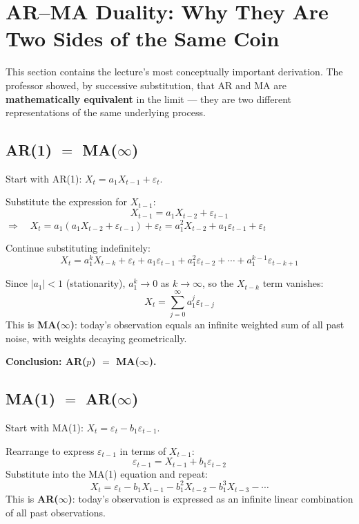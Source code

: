 \documentclass[11pt]{article}
\begin{document}
\section{AR--MA Duality: Why They Are Two Sides of the Same Coin}

This section contains the lecture's most conceptually important derivation.
The professor showed, by successive substitution, that AR and MA are
\textbf{mathematically equivalent} in the limit --- they are two different
representations of the same underlying process.

\subsection{AR(1) $=$ MA($\infty$)}
Start with AR(1): $X_t = a_1 X_{t-1} + \varepsilon_t$.

Substitute the expression for $X_{t-1}$:
\[
X_{t-1} = a_1 X_{t-2} + \varepsilon_{t-1}
\]
$\Rightarrow\quad X_t = a_1(a_1 X_{t-2} + \varepsilon_{t-1}) + \varepsilon_t
= a_1^2 X_{t-2} + a_1 \varepsilon_{t-1} + \varepsilon_t$

Continue substituting indefinitely:
\[
X_t = a_1^k X_{t-k} + \varepsilon_t + a_1 \varepsilon_{t-1}
    + a_1^2 \varepsilon_{t-2} + \cdots + a_1^{k-1} \varepsilon_{t-k+1}
\]

Since $|a_1| < 1$ (stationarity), $a_1^k \to 0$ as $k \to \infty$, so the
$X_{t-k}$ term vanishes:
\[
\boxed{X_t = \sum_{j=0}^{\infty} a_1^j \varepsilon_{t-j}}
\]
This is \textbf{MA($\infty$)}: today's observation equals an infinite weighted
sum of all past noise, with weights decaying geometrically.

\textbf{Conclusion: AR($p$) $=$ MA($\infty$).}

\subsection{MA(1) $=$ AR($\infty$)}
Start with MA(1): $X_t = \varepsilon_t - b_1 \varepsilon_{t-1}$.

Rearrange to express $\varepsilon_{t-1}$ in terms of $X_{t-1}$:
\[
\varepsilon_{t-1} = X_{t-1} + b_1 \varepsilon_{t-2}
\]
Substitute into the MA(1) equation and repeat:
\[
X_t = \varepsilon_t - b_1 X_{t-1} - b_1^2 X_{t-2} - b_1^3 X_{t-3} - \cdots
\]
This is \textbf{AR($\infty$)}: today's observation is expressed as an infinite
linear combination of all past observations.
\end{document}
